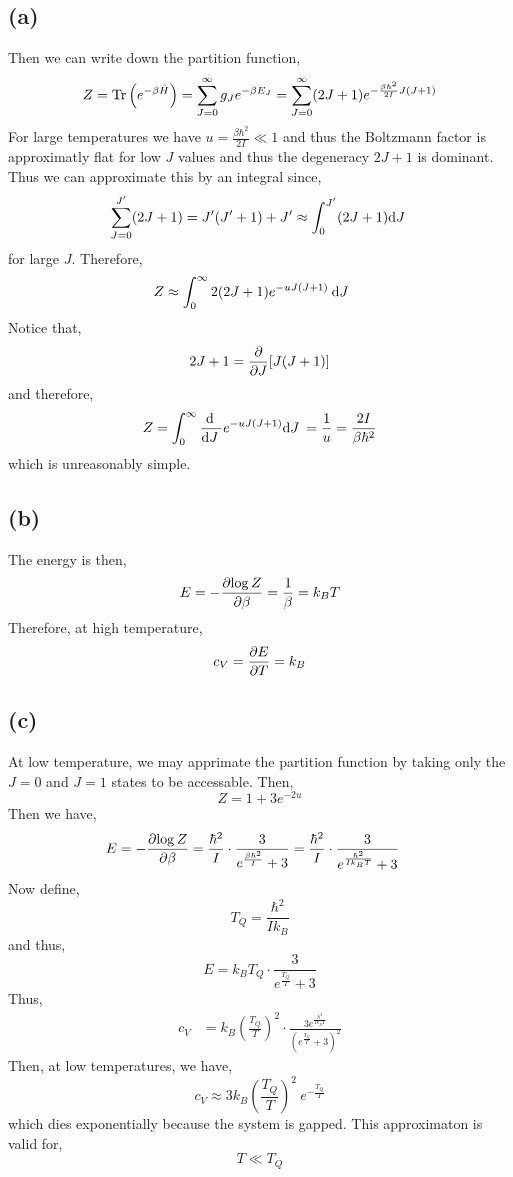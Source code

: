 \documentclass[12pt]{extarticle}
\begin{document}
\subsection*{(a)}

Then we can write down the partition function,
\[ Z = \mathrm{Tr} \left( e^{-\beta \hat{H}} \right) = \sum_{J = 0}^\infty g_J e^{- \beta E_J} = \sum_{J = 0}^\infty (2 J + 1) e^{-\frac{\beta \hbar^2}{2 I} J(J + 1)} \]
For large temperatures we have $u = \frac{\beta \hbar^2}{2 I} \ll 1$ and thus the Boltzmann factor is approximatly flat for low $J$ values and thus the degeneracy $2 J + 1$ is dominant. Thus we can approximate this by an integral since,
\[ \sum_{J = 0}^{J'} (2 J + 1) = J'(J' + 1) + J' \approx \int_{0}^{J'} (2 J + 1) \mathrm{d}J \: \]
for large $J$.
Therefore,
\begin{align*}
Z & \approx \int_0^{\infty} 2 (2 J + 1) e^{-u J(J + 1)} \: \mathrm{d}J \:
\end{align*}
Notice that,
\[ 2 J + 1 = \frac{\partial{}}{\partial{J}} [J ( J + 1) ] \]
and therefore,
\[ Z = \int_0^{\infty} \frac{\mathrm{d} \:}{\mathrm{d}J \:} e^{-u J ( J + 1)} \mathrm{d}J \: = \frac{1}{u} = \frac{2 I}{\beta \hbar^2} \]
which is unreasonably simple. 

\subsection*{(b)}

The energy is then,
\[ E = - \frac{\partial{\log{Z}}}{\partial{\beta}} = \frac{1}{\beta} = k_B T \]
Therefore, at high temperature,
\[ c_V = \frac{\partial{E}}{\partial{T}} = k_B \]

\subsection*{(c)}

At low temperature, we may apprimate the partition function by taking only the $J = 0$ and $J = 1$ states to be accessable. Then,
\[ Z = 1 + 3 e^{-2 u } \]
Then we have,
\begin{align*}
E & = - \frac{\partial{\log{Z}}}{\partial{\beta}} = \frac{\hbar^2}{I} \cdot \frac{3}{e^{\frac{\beta \hbar^2}{I}} + 3} = \frac{\hbar^2}{I} \cdot \frac{3}{e^{\frac{\hbar^2}{I k_B T}} + 3} 
\end{align*}
Now define,
\[ T_Q = \frac{\hbar^2}{I k_B} \]
and thus,
\[ E = k_B T_Q \cdot \frac{3}{e^{\frac{T_Q}{T}} + 3} \]
Thus,
\begin{align*}
c_V & = k_B \left( \frac{T_Q}{T} \right)^2 \cdot \frac{3 e^{\frac{\hbar^2}{I k_B T}}}{(e^{\frac{T_Q}{T}} + 3)^2}
\end{align*}
Then, at low temperatures, we have,
\[ c_V \approx 3 k_B \left( \frac{T_Q}{T} \right)^2 \: e^{-\frac{T_Q}{T}}  \]
which dies exponentially because the system is gapped. This approximaton is valid for,
\[ T \ll T_Q \]
\end{document}
